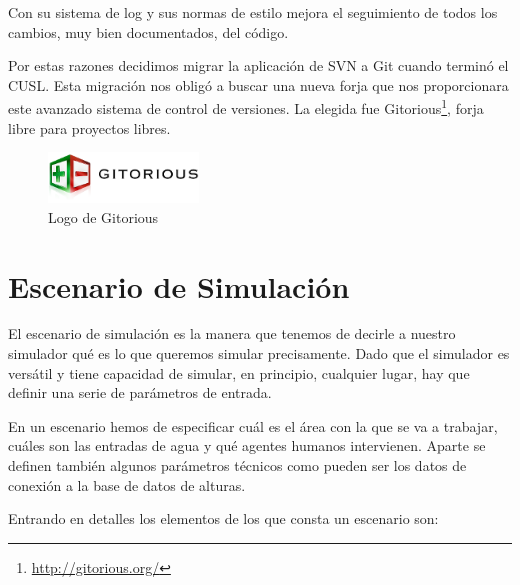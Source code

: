 Con su sistema de log y sus normas de estilo mejora el seguimiento de todos los
cambios, muy bien documentados, del código.

Por estas razones decidimos migrar la aplicación de SVN a Git cuando terminó el
CUSL. Esta migración nos obligó a buscar una nueva forja que nos proporcionara
este avanzado sistema de control de versiones. La elegida fue
Gitorious\footnote{\url{http://gitorious.org/}}, forja libre para proyectos
libres.

\begin{figure}[H]
 \centering
 \includegraphics[width=40mm]{figuras/cap5/gitorious.png}
 \caption{Logo de Gitorious}
\end{figure}

\section*{Escenario de Simulación}

El escenario de simulación es la manera que tenemos de decirle a nuestro
simulador qué es lo que queremos simular precisamente. Dado que el simulador es
versátil y tiene capacidad de simular, en principio, cualquier lugar, hay que
definir una serie de parámetros de entrada.

En un escenario hemos de especificar cuál es el área con la que se va a
trabajar, cuáles son las entradas de agua y qué agentes humanos intervienen.
Aparte se definen también algunos parámetros técnicos como pueden ser los datos
de conexión a la base de datos de alturas.

Entrando en detalles los elementos de los que consta un escenario son:

